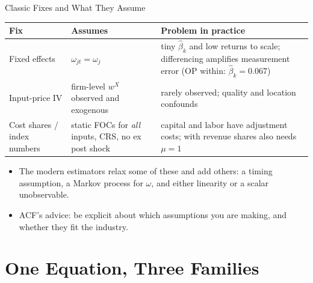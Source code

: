 \documentclass[aspectratio=169,10pt]{beamer}
\begin{document}
\begin{frame}{Classic Fixes and What They Assume}
\small
\renewcommand{\arraystretch}{1.25}
\begin{tabularx}{\textwidth}{@{}l X X@{}}
\toprule
Fix & Assumes & Problem in practice \\
\midrule
Fixed effects & $\omega_{jt} = \omega_j$ & tiny $\hat\beta_k$ and low returns to scale; differencing amplifies measurement error (OP within: $\hat\beta_k = 0.067$) \\
Input-price IV & firm-level $w^X$ observed and exogenous & rarely observed; quality and location confounds \\
Cost shares / index numbers & static FOCs for \emph{all} inputs, CRS, no ex post shock & capital and labor have adjustment costs; with revenue shares also needs $\mu = 1$ \\
\bottomrule
\end{tabularx}
\vspace{1em}
\begin{itemize}
\item The modern estimators relax some of these and add others: a timing assumption, a Markov process for $\omega$, and either linearity or a scalar unobservable.
\item ACF's advice: be explicit about which assumptions you are making, and whether they fit the industry.
\end{itemize}
\end{frame}


\section{One Equation, Three Families}
\end{document}

